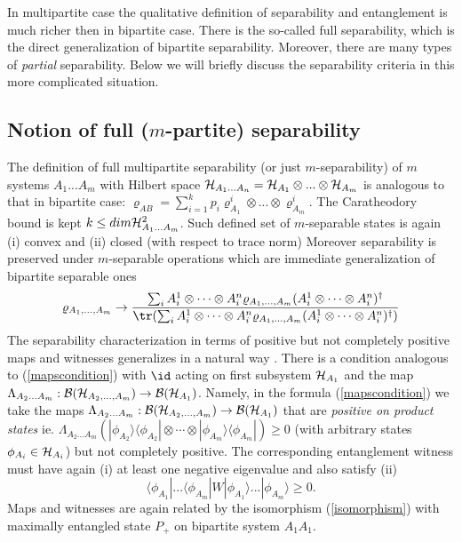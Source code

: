 \documentclass[twocolumn,aps,rmp]{revtex4}
\begin{document}
In multipartite case the qualitative definition of separability and
entanglement is much richer then in bipartite case. There is the
so-called full separability, which is the direct generalization of
bipartite separability. Moreover, there are many types of {\it
  partial} separability. Below we will briefly discuss the
separability criteria in this more complicated situation.


\subsection{Notion of full ($m$-partite) separability }
\label{sec:full-sep}

The definition of full multipartite separability (or just
$m$-separability) of $m$ systems $A_{1}...A_{m}$ with Hilbert space
${\cal H}_{A_{1}...A_{n}}= {\cal H}_{A_{1}} \otimes ... \otimes {\cal
  H}_{A_{m}}$ is analogous to that in bipartite case: $\varrho_{AB} =
\sum_{i=1}^{k} p_{i} \varrho_{A_1}^{i} \otimes ...\otimes
\varrho_{A_{m}}^{i}$. The Caratheodory bound is kept $k\leq dim {\cal
  H}_{A_{1}...A_{m}}^{2}$.  Such defined set of $m$-separable states
is again (i) convex and (ii) closed (with respect to trace norm)
Moreover separability is preserved under $m$-separable operations
which are immediate generalization of bipartite separable ones
\begin{equation}
\varrho_{A_1,\ldots,A_{m}} \rightarrow {\sum_{i} A_{i}^{1} \otimes \cdots
\otimes A^{n}_{i} \varrho_{A_{1},\ldots,A_{m}} (A_{i}^{1} \otimes \cdots
\otimes A^{n}_{i})^{\dagger}\over  \tr(\sum_{i} A_{i}^{1} \otimes \cdots
\otimes A^{n}_{i} \varrho_{A_{1},\ldots,A_{m}} (A_{i}^{1} \otimes \cdots
\otimes A^{n}_{i})^{\dagger})}
\end{equation}
The separability characterization in terms of positive but not
completely positive maps and witnesses generalizes in a natural way
\cite{multisep}. There is a condition analogous to
(\ref{mapscondition}) with $\id$ acting on first subsystem ${\cal
  H}_{A_{1}}$ and the map $\Lambda_{A_{2}...A_{m}}: {\cal B}({\cal
  H}_{A_{2},\ldots,A_{m}})\rightarrow {\cal B}({\cal
  H}_{A_{1}})$. Namely, in the formula (\ref{mapscondition}) we take
the maps $\Lambda_{A_{2}...A_{m}}: {\cal B}({\cal
  H}_{A_{2},\ldots,A_{m}}) \rightarrow {\cal B}({\cal H}_{A_{1}})$
that are {\it positive on product states}
ie. $\Lambda_{A_{2}...A_{m}}(|\phi_{A_{2}}\rangle \langle \phi_{A_{2}}
| \otimes \cdots \otimes |\phi_{A_{m}}\rangle \langle
\phi_{A_{m}}|)\geq 0$ (with arbitrary states $\phi_{A_{i}}\in {\cal
  H}_{A_{i}}$) but not completely positive. The corresponding
entanglement witness must have again (i) at least one negative
eigenvalue and also satisfy (ii)
\begin{equation}
\langle \phi_{A_{1}}| ...\langle \phi_{A_{m}}| W
|\phi_{A_{1}}\rangle ...|\phi_{A_{m}}\rangle \geq 0.
\label{witnesscondition(m)}
\end{equation}
Maps and witnesses are again related by the isomorphism
(\ref{isomorphism}) with maximally entangled state $P_{+}$ on
bipartite system $A_{1}A_{1}$.
\end{document}
